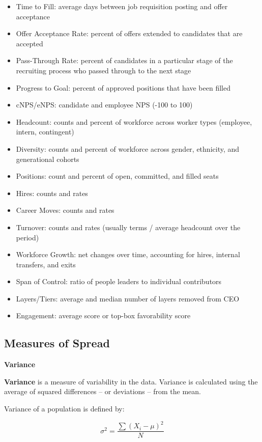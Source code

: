 \documentclass[]{book}
\providecommand{\tightlist}{%
  \setlength{\itemsep}{0pt}\setlength{\parskip}{0pt}}
\begin{document}
\begin{itemize}
\tightlist
\item
  Time to Fill: average days between job requisition posting and offer acceptance
\item
  Offer Acceptance Rate: percent of offers extended to candidates that are accepted
\item
  Pass-Through Rate: percent of candidates in a particular stage of the recruiting process who passed through to the next stage
\item
  Progress to Goal: percent of approved positions that have been filled
\item
  cNPS/eNPS: candidate and employee NPS (-100 to 100)
\item
  Headcount: counts and percent of workforce across worker types (employee, intern, contingent)
\item
  Diversity: counts and percent of workforce across gender, ethnicity, and generational cohorts
\item
  Positions: count and percent of open, committed, and filled seats
\item
  Hires: counts and rates
\item
  Career Moves: counts and rates
\item
  Turnover: counts and rates (usually terms / average headcount over the period)
\item
  Workforce Growth: net changes over time, accounting for hires, internal transfers, and exits
\item
  Span of Control: ratio of people leaders to individual contributors
\item
  Layers/Tiers: average and median number of layers removed from CEO
\item
  Engagement: average score or top-box favorability score
\end{itemize}

\hypertarget{measures-of-spread}{%
\subsection{Measures of Spread}\label{measures-of-spread}}

\textbf{Variance}

\textbf{Variance} is a measure of variability in the data. Variance is calculated using the average of squared differences -- or deviations -- from the mean.

Variance of a population is defined by:

\[ \sigma^{2} = \frac{\sum (X_{i}-\mu)^{2}}{N} \]
\end{document}
